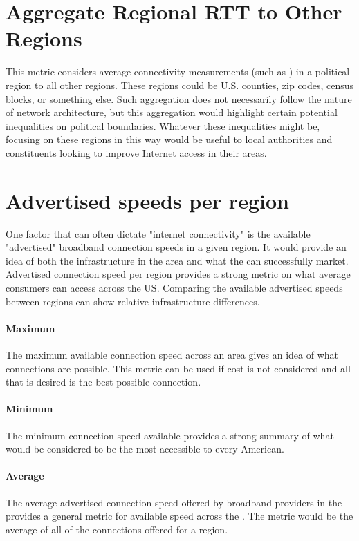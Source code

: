 \section{Aggregate Regional RTT to Other Regions}

This metric considers average connectivity measurements (such as \rtt) in a political region to all other regions. These regions could be U.S. counties, zip codes, census blocks, or something else. Such aggregation does not necessarily follow the nature of network architecture, but this aggregation would highlight certain potential inequalities on political boundaries. Whatever these inequalities might be, focusing on these regions in this way would be useful to local authorities and constituents looking to improve Internet access in their areas.

\section{Advertised speeds per region}
One factor that can often dictate "internet connectivity" is the available "advertised" broadband connection speeds in a given region. It would provide an idea of both the infrastructure in the area and what the \isp can successfully market. Advertised connection speed per region provides a strong metric on what average consumers can access across the US. Comparing the available advertised speeds between regions can show relative infrastructure differences.

\paragraph{Maximum}
The maximum available connection speed across an area gives an idea of what connections are possible. This metric can be used if cost is not considered and all that is desired is the best possible connection.

\paragraph{Minimum}
The minimum connection speed available provides a strong summary of what would be considered to be the most accessible to every American.

\paragraph{Average}
The average advertised connection speed offered by broadband providers in the \us provides a general metric for available speed across the \us. The metric would be the average of all of the connections offered for a region.

